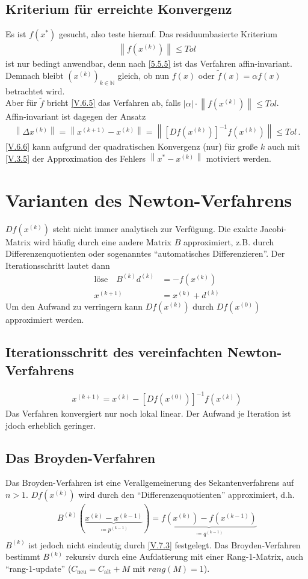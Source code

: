\documentclass[ngerman,fontsize=11pt, paper=a4, parskip=half, titlepage=true, toc=bib]{scrbook}
\theoremstyle{definition}
\theoremstyle{plain}
\newcommand{\N}{\mathds{N}}
\newcommand{\nn}[1]{\left\| #1 \right\|}
\newcommand{\sectione}[1]{\section{#1} \setcounter{equation}{0}}
\newcommand{\subsectione}[1]{\subsection{#1} \addtocounter{Def}{1}}
\begin{document}
  
  \subsectione{Kriterium für erreichte Konvergenz}
  Es ist $f(x^{*})$ gesucht, also teste hierauf. Das residuumbasierte Kriterium
  \begin{gather}
    \nn{f(x^{(k)})}\leq Tol
    \label{V.6.5}
  \end{gather}
  ist nur bedingt anwendbar, denn nach \ref{5.5.5} ist das Verfahren affin-invariant.
  Demnach bleibt $(x^{(k)})_{k\in\N}$ gleich,
  ob nun $f(x)$ oder $\widetilde{f}(x) =\alpha f(x) $ betrachtet wird.\\
  Aber für $\widetilde{f}$ bricht \eqref{V.6.5} das Verfahren ab, 
  falls $|\alpha|\cdot \nn{f(x^{(k)})} \leq Tol$. \\
  Affin-invariant ist dagegen der Ansatz
  \begin{gather}
    \nn{\Delta x^{(k)}}= \nn{x^{(k+1)}-x^{(k)}} 
    = \nn{[Df(x^{(k)})]^{-1}f(x^{(k)})} 
    \leq Tol \, .
    \label{V.6.6}
  \end{gather}
  \eqref{V.6.6} kann aufgrund der quadratischen Konvergenz (nur) für 
  große $k$ auch mit \eqref{V.3.5} der Approximation des Fehlers 
  $\nn{x^{*}-x^{(k)}} $ motiviert werden.
  
  
  \sectione{Varianten des Newton-Verfahrens}
  $Df(x^{(k)})$ steht nicht immer analytisch zur Verfügung.
  Die exakte Jacobi-Matrix wird häufig durch eine andere Matrix $B$ approximiert, 
  z.B. durch Differenzenquotienten oder sogenanntes
  \enquote{automatisches Differenzieren}.
  Der Iterationsschritt lautet dann
  \begin{align}
    \text{löse}\quad B^{(k)}d^{(k)} &= -f(x^{(k)}) 
                                      \label{V.7.1} \\\nonumber
    x^{(k+1)} &=x^{(k)} + d^{(k)}
  \end{align}
  Um den Aufwand zu verringern kann $Df(x^{(k)})$ durch
  $Df(x^{(0)})$ approximiert werden.
  
  
  \subsectione{Iterationsschritt des vereinfachten Newton-Verfahrens}
  \begin{gather}
    x^{(k+1)} = x^{(k)} -[Df(x^{(0)})]^{-1} f(x^{(k)})
    \label{V.7.2}
  \end{gather}
  Das Verfahren konvergiert nur noch lokal linear.
  Der Aufwand je Iteration ist jdoch erheblich geringer.
  
  
  
  \subsectione{Das Broyden-Verfahren}
  Das Broyden-Verfahren ist eine Verallgemeinerung des Sekantenverfahrens
  auf $n>1$. $Df(x^{(k)})$ wird durch den
  \enquote{Differenzenquotienten} approximiert, d.h.
  \begin{gather}
    B^{(k)}(\underbrace{x^{(k)}-x^{(k-1)}}_{\coloneqq p^{(k-1)}})
    = \underbrace{f(x^{(k)})-f(x^{(k-1)})}_{\coloneqq
      q^{(k-1)}}
    \label{V.7.3}
  \end{gather}
  $B^{(k)}$ ist jedoch nicht eindeutig durch \eqref{V.7.3} festgelegt.
  Das Broyden-Verfahren bestimmt $B^{(k)}$ rekursiv durch eine 
  Aufdatierung mit einer Rang-1-Matrix, auch \enquote{rang-1-update}
  ($C_\text{neu} = C_\text{alt} +M$ mit $rang(M)=1$). \\
\end{document}
